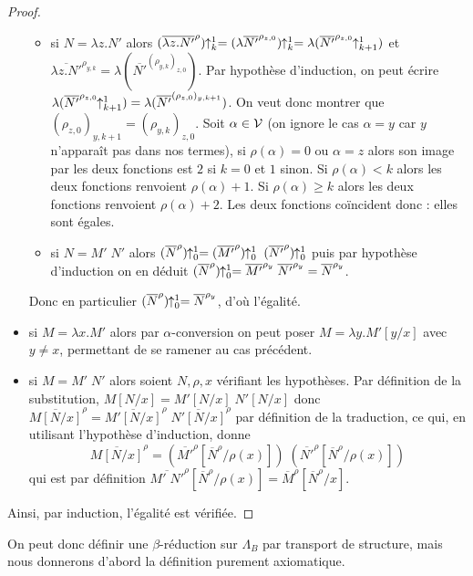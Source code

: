 \begin{proof}
\begin{itemize}[label=$\bullet$]
\begin{itemize}[label=$\bullet$]
            \item si $N = \lambda z. N'$ alors $(\overline{\lambda z.N'}^\rho)\!\!\uparrow_k^1 = (\lambda \overline{N'}^{\rho_{z,0}})\!\!\uparrow_k^1 = \lambda (\overline{N'}^{\rho_{z,0}}\!\!\uparrow_{k+1}^1)$ et $\overline {\lambda z.N'}^{\rho_{y,k}} = \lambda (\overline{N'}^{(\rho_{y,k})_{z,0}})$. Par hypothèse d'induction, on peut écrire $\lambda(\overline{N'}^{\rho_{z,0}}\!\!\uparrow_{k+1}^1) = \lambda (\overline{N'}^{(\rho_{z,0})_{y,k+1}})$. On veut donc montrer que $(\rho_{z,0})_{y,k+1} = (\rho_{y,k})_{z,0}$. Soit $\alpha\in\mathcal V$ (on ignore le cas $\alpha = y$ car $y$ n'apparaît pas dans nos termes), si $\rho(\alpha) = 0$ ou $\alpha = z$ alors son image par les deux fonctions est $2$ si $k = 0$ et $1$ sinon. Si $\rho(\alpha) < k$ alors les deux fonctions renvoient $\rho(\alpha) + 1$. Si $\rho(\alpha) \geq k$ alors les deux fonctions renvoient $\rho(\alpha) + 2$. Les deux fonctions coïncident donc : elles sont égales.
            \item si $N = M'\;N'$ alors $(\overline N^\rho)\!\!\uparrow_0^1 = (\overline{M'}^\rho)\!\!\uparrow_0^1\;(\overline{N'}^\rho)\!\!\uparrow_0^1$ puis par hypothèse d'induction on en déduit $(\overline N^\rho)\!\!\uparrow_0^1 = \overline{M'}^{\rho_y}\;\overline{N'}^{\rho_y} = \overline{N}^{\rho_y}$.
        \end{itemize}
        Donc en particulier $(\overline N^\rho)\!\!\uparrow_0^1 = \overline N^{\rho_y}$, d'où l'égalité.
        \item si $M = \lambda x.M'$ alors par $\alpha$-conversion on peut poser $M=\lambda y.M'[y/x]$ avec $y\neq x$, permettant de se ramener au cas précédent.
        \item si $M = M'\;N'$ alors soient $N,\rho,x$ vérifiant les hypothèses. Par définition de la substitution, $M[N/x] = M'[N/x]\;N'[N/x]$ donc $\overline{M[N/x]}^\rho = \overline{M'[N/x]}^\rho\;\overline{N'[N/x]}^\rho$ par définition de la traduction, ce qui, en utilisant l'hypothèse d'induction, donne $$\overline{M[N/x]}^\rho = (\overline{M'}^\rho[\overline N^\rho/\rho(x)])\;(\overline{N'}^\rho[\overline N^\rho/\rho(x)])$$ qui est par définition $\overline{M'\;N'}^\rho[\overline N^\rho/\rho(x)] = \overline M^\rho[\overline N^\rho/x]$.
    \end{itemize}

    Ainsi, par induction, l'égalité est vérifiée.
\end{proof}

On peut donc définir une $\beta$-réduction sur $\Lambda_B$ par transport de structure, mais nous donnerons d'abord la définition purement axiomatique.

